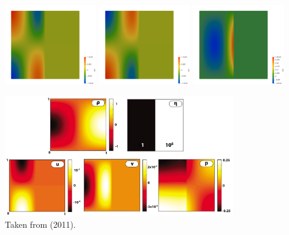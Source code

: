 \begin{center}
\includegraphics[width=4cm]{python_codes/fieldstone_158/results/exp3/exx}
\includegraphics[width=4cm]{python_codes/fieldstone_158/results/exp3/eyy}
\includegraphics[width=4cm]{python_codes/fieldstone_158/results/exp3/exy}
\end{center} 

\begin{center}
\includegraphics[width=10cm]{python_codes/fieldstone_158/images/solcx}\\
{\captionfont Taken from \textcite{dumg11} (2011). }
\end{center} 

